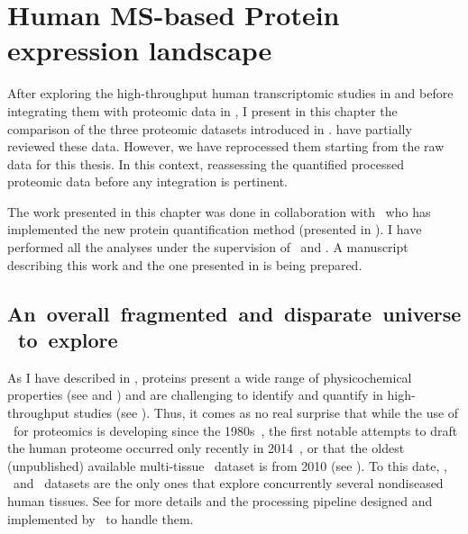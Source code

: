 \chapter{Human MS-based Protein expression landscape}\label{ch:proteomics}

\setlength{\epigraphwidth}{0.7\textwidth}
    \setlength{\epigraphrule}{0pt}

After exploring the high-throughput human transcriptomic studies
in 
and before integrating them with proteomic data in ,
I present in this chapter the comparison of
the three proteomic datasets introduced in .
\citet{Ezkurdia2014-qx,Deutsch2015} have partially reviewed these data.
However, we have reprocessed them starting from the raw data
for this thesis.
In this context, reassessing the quantified processed proteomic data
before any integration is pertinent.

The work presented in this chapter was done in collaboration with \james\
who has implemented the new protein quantification method
(presented in ).
I have performed all the analyses under
the supervision of \alvis\ and \jyoti.
A manuscript describing this work and the one presented in 
is being prepared.

\section{An~overall~fragmented~and~disparate~universe~to~explore}

As I have described in ,
proteins present a wide range of physicochemical properties
(see  and )
and are challenging to identify and quantify
in high-throughput studies (see ).
Thus, it comes as no real surprise that
while the use of \ms\ for proteomics is developing since the 1980s~,
the first notable attempts to draft the human proteome occurred only recently
in 2014~\mycite{PandeyData,KusterData},
or that the oldest (unpublished) available multi-tissue \cutler\ dataset is from 2010
(see \Cref{subsec:cutler}).
To this date,
\cutler, \kuster\ and \pandey\ datasets are the only ones
that explore concurrently several nondiseased human tissues.
See  for more details and
the processing pipeline designed and implemented by \james\ to handle them.

